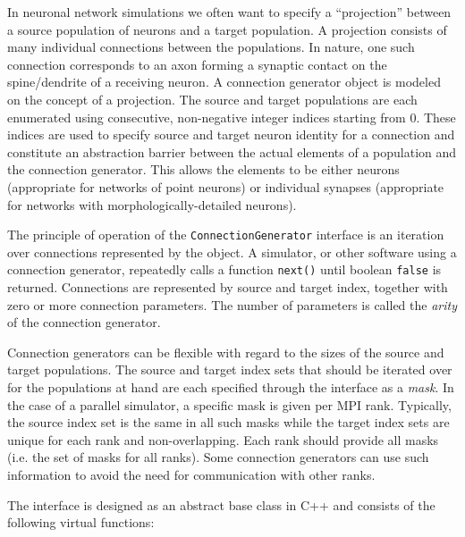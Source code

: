 \documentclass{frontiersSCNS} %
\begin{document}
In neuronal network simulations we often want to specify a ``projection''
between a source population of neurons and a target population.
A projection consists of many individual connections between
the populations.  In nature, one such connection
corresponds to an axon forming a synaptic contact on the
spine/dendrite of a receiving neuron.  A connection generator object
is modeled on the concept of a projection.  The source and target
populations are each enumerated using consecutive, non-negative integer indices
starting from 0.
These indices
are used to specify source and target neuron identity for a connection
and constitute an abstraction barrier between the actual elements of a
population and the connection generator.  This allows the elements to
be either neurons (appropriate for networks of point neurons) or individual synapses 
(appropriate for networks with morphologically-detailed neurons).

The principle of operation of the \verb|ConnectionGenerator| interface
is an iteration over connections represented by the object.  A
simulator, or other software using a connection generator, repeatedly
calls a function \verb|next()| until boolean \verb|false| is
returned. Connections are represented by source and target index,
together with zero or more connection parameters.  The
number of parameters is called the \emph{arity} of the connection
generator.

Connection generators can be flexible with regard to the sizes of the
source and target populations. The source and target index sets that
should be iterated over for the populations at hand are each specified
through the interface as a \emph{mask}.  In the case of a parallel
simulator, a specific mask is given per MPI rank.  Typically, the source
index set is the same in all such masks while the target index sets
are unique for each rank and non-overlapping.  Each rank should
provide all masks (i.e. the set of masks for all ranks). Some
connection generators can use such information to avoid the need for
communication with other ranks.

The interface is designed as an abstract base class in C++
and consists of the following virtual functions:
\end{document}
